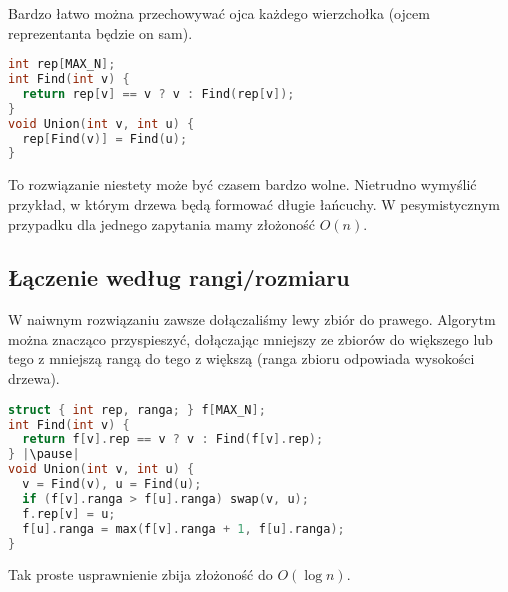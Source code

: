 \documentclass[../main.tex]{subfiles}
\begin{document}
\begin{frame}[fragile]{\subsecname}

Bardzo łatwo można przechowywać ojca każdego wierzchołka (ojcem reprezentanta będzie on sam).

\pause
\begin{block}{}
\begin{lstlisting}[language = C++]
int rep[MAX_N];
int Find(int v) {
  return rep[v] == v ? v : Find(rep[v]);
}
void Union(int v, int u) {
  rep[Find(v)] = Find(u);
}
\end{lstlisting}
\end{block}

\pause
To rozwiązanie niestety może być czasem bardzo wolne. Nietrudno wymyślić przykład, w którym
drzewa będą formować długie łańcuchy. W pesymistycznym przypadku dla jednego zapytania mamy
złożoność $O(n)$.

\end{frame}

\subsection{Łączenie według rangi/rozmiaru}

\begin{frame}[fragile]{\subsecname}

W naiwnym rozwiązaniu zawsze dołączaliśmy lewy zbiór do prawego. Algorytm można znacząco
przyspieszyć, dołączając mniejszy ze zbiorów do większego lub tego z mniejszą rangą do tego z 
większą (ranga zbioru odpowiada wysokości drzewa).

\pause
\begin{block}{}
\begin{lstlisting}[language = C++]
struct { int rep, ranga; } f[MAX_N];
int Find(int v) {
  return f[v].rep == v ? v : Find(f[v].rep);
} |\pause|
void Union(int v, int u) {
  v = Find(v), u = Find(u);
  if (f[v].ranga > f[u].ranga) swap(v, u);
  f.rep[v] = u;
  f[u].ranga = max(f[v].ranga + 1, f[u].ranga);
}
\end{lstlisting}
\end{block}

\pause
Tak proste usprawnienie zbija złożoność do $O(\log{n})$.

\end{frame}
\end{document}
